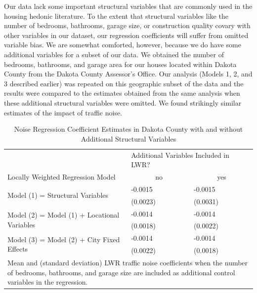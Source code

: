 \documentclass{article}\usepackage{graphicx, color}
\begin{document}
Our data lack some important structural variables that are commonly used in the housing hedonic literature. To the extent that structural variables like the number of bedrooms, bathrooms, garage size, or construction quality covary with other variables in our dataset, our regression coefficients will suffer from omitted variable bias. We are somewhat comforted, however, because we do have some additional variables for a subset of our data. We obtained the number of bedrooms, bathrooms, and garage area for our houses located within Dakota County from the Dakota County Assessor's Office. Our analysis (Models 1, 2, and 3 described earlier) was repeated on this geographic subset of the data and the results were compared to the estimates obtained from the same analysis when these additional structural variables were omitted. We found strikingly similar estimates of the impact of traffic noise.

\begin{table}[ht]
\begin{center}
\caption{Noise Regression Coefficient Estimates in Dakota County with and without Additional Structural Variables}\label{tab:Dak}
\begin{tabular}{lll}
 & \multicolumn{2}{p{1.25in}}{Additional Variables Included in LWR?} \\
Locally Weighted Regression Model & \multicolumn{1}{c}{no} & \multicolumn{1}{c}{yes} \\ \cline{1-3}
\multirow{2}{*}{Model (1) = Structural Variables} & -0.0015 & -0.0015 \\ 
   & (0.0023) & (0.0031)  \\[.2cm]
\multirow{2}{*}{Model (2) = Model (1) + Locational Variables} & -0.0014 & -0.0014  \\ 
   & (0.0018) & (0.0022)  \\[.2cm] 
\multirow{2}{*}{Model (3) = Model (2) + City Fixed Effects} & -0.0014 & -0.0014 \\ 
   & (0.0022) & (0.0018) \\[.2cm] \cline{1-3}
\multicolumn{3}{p{4.25in}}{Mean and (standard deviation) LWR traffic noise coefficients when the number of bedrooms, bathrooms, and garage size are included as additional control variables in the regression.}
\end{tabular}
\end{center}
\end{table}
\end{document}
